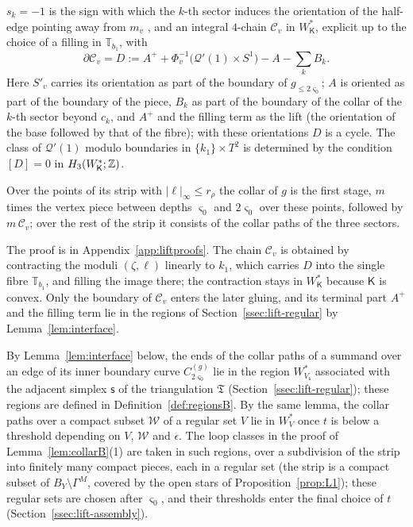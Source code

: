 \begin{lemma}
\begin{enumerate}
$s_k=-1$ is the sign with which the $k$-th sector induces the orientation of the half-edge pointing away from $m_v$
\cite[\S7.7, Step~2]{CBM}, and an integral $4$-chain $\mathscr C_v$ in $W^*_{\mathsf K}$, explicit up to the choice of a
filling in $\mathbb T_{b_1}$, with
\[
\partial\mathscr C_v=D:=A^++\Phi_v^{-1}\bigl(\mathcal Q'(1)\times S^1\bigr)-A-\sum_kB_k.
\]
Here $S'_v$ carries its orientation as part of the boundary of $g_{\le2\varsigma_0}$; $A$ is oriented as part of the
boundary of the piece, $B_k$ as part of the boundary of the collar of the $k$-th sector beyond $c_k$, and $A^+$ and the
filling term as the lift (the orientation of the base followed by that of the fibre); with these orientations $D$ is a
cycle. The class of $\mathcal Q'(1)$ modulo boundaries in $\{k_1\}\times T^2$ is
determined by the condition $[D]=0$ in $H_3(W^*_{\mathsf K};\mathbb Z)$.
\end{enumerate}
Over the points of its strip with $|\ell|_\infty\le r_\rho$ the collar of $g$ is the first stage, $m$ times the vertex
piece between depths $\varsigma_0$ and $2\varsigma_0$ over these points, followed by $m\,\mathscr C_v$; over the rest of the strip it
consists of the collar paths of the three sectors.
\end{lemma}

The proof is in Appendix~\ref{app:liftproofs}. The chain $\mathscr C_v$ is obtained by contracting the moduli
$(\zeta,\ell)$ linearly to $k_1$, which carries $D$ into the single fibre $\mathbb T_{b_1}$, and filling the image there;
the contraction stays in $W^*_{\mathsf K}$ because $\mathsf K$ is convex. Only the boundary of $\mathscr C_v$ enters the later gluing, and
its terminal part $A^+$ and the filling term lie in the regions of Section~\ref{ssec:lift-regular} by
Lemma~\ref{lem:interface}.

By Lemma~\ref{lem:interface} below, the ends of the collar paths of a summand over an edge of its inner boundary curve
$C^{(g)}_{2\varsigma_0}$ lie in the region $W^*_{V_{\mathsf s}}$ associated with the adjacent simplex $\mathsf s$ of the
triangulation $\mathfrak T$ (Section~\ref{ssec:lift-regular}); these regions are defined in Definition~\ref{def:regionsB}.
By the same lemma, the collar paths over a compact subset $\mathcal W$ of a regular set $V$ lie in $W^*_V$ once $t$ is
below a threshold depending on $V$, $\mathcal W$ and $\epsilon$. The loop classes in the proof of
Lemma~\ref{lem:collarB}(1) are taken in such regions, over a subdivision of the strip into finitely many compact
pieces, each in a regular set (the strip is a compact subset of $B_Y\setminus\Gamma^M$, covered by the open stars of
Proposition~\ref{prop:L1}); these regular sets are chosen after $\varsigma_0$, and their thresholds enter the final
choice of $t$ (Section~\ref{ssec:lift-assembly}).

